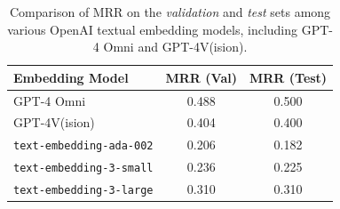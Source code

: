 \begin{table}[!t]
  \centering
  \small
  \begin{tabular}{lcc}
    \toprule
    \textbf{Embedding Model} & \textbf{MRR (Val)} & \textbf{MRR (Test)} \\
    \midrule
    GPT-4 Omni  & 0.488 & 0.500 \\
    GPT-4V(ision) & 0.404 & 0.400 \\
    \addlinespace[0.2em]\hdashline\addlinespace[0.2em]
    \texttt{text-embedding-ada-002} & 0.206 & 0.182 \\
    \texttt{text-embedding-3-small} & 0.236 & 0.225 \\
    \texttt{text-embedding-3-large} & 0.310 & 0.310 \\
    \bottomrule
  \end{tabular}
  \caption{Comparison of MRR on the \emph{validation} and \emph{test} sets among various OpenAI textual embedding models, including GPT-4 Omni and GPT-4V(ision).}
  \label{tab:gpt_embedding_mrr}
\end{table}